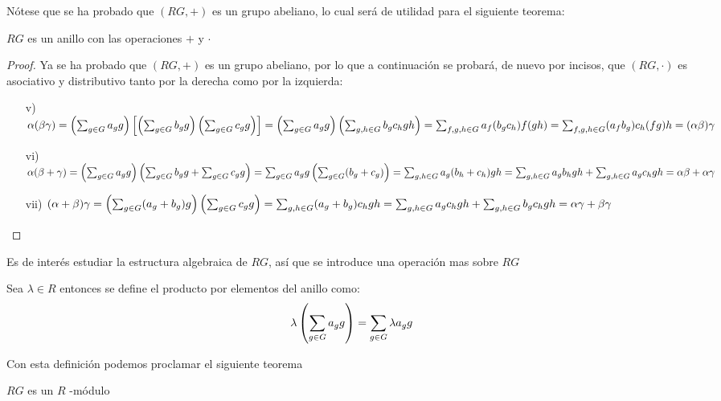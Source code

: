 Nótese que se ha probado que $(RG,+)$ es un grupo abeliano, lo cual será de utilidad para el siguiente teorema:

\begin{teorema}
$RG$ es un anillo con las operaciones $+$ y $\cdot$
\end{teorema}


\begin{proof}
Ya se ha probado que $(RG,+)$ es un grupo abeliano, por lo que a continuación se probará, de nuevo por incisos, que $(RG,\cdot)$ es asociativo y distributivo tanto por la derecha como por la izquierda:
\begin{itemize}
\item[v)] $\alpha(\beta\gamma) = \left(\sum_{g \in G} a_{g} g\right)\left[\left(\sum_{g \in G} b_{g} g\right)\left(\sum_{g \in G} c_{g} g\right)\right] = \left(\sum_{g \in G} a_{g} g\right)\left(\sum_{g,h\in G}b_gc_hgh\right) = \sum_{f,g,h \in G}a_f(b_gc_h)f(gh) = \sum_{f,g,h \in G} (a_fb_g)c_h(fg)h = (\alpha\beta)\gamma$
\item[vi)]  $\alpha(\beta + \gamma) = \left( \sum_{g \in G} a_{g} g \right) \left(\sum_{g \in G} b_{g} g + \sum_{g \in G} c_{g} g \right) = \sum_{g \in G} a_{g} g \left( \sum_{g \in G}(b_g+c_g)\right) = \sum_{g,h \in G}a_g(b_h+c_h)gh  = \sum_{g,h \in G} a_gb_hgh + \sum_{g,h \in G} a_gc_hgh = \alpha\beta + \alpha\gamma$  
\item[vii)] $(\alpha + \beta)\gamma = \left( \sum_{g\in G}(a_g+b_g)g\right) \left(\sum_{g \in G} c_{g} g\right) = \sum_{g,h \in G} (a_g+b_g)c_hgh = \sum_{g,h \in G}a_gc_hgh + \sum_{g,h\in G}b_gc_hgh = \alpha\gamma + \beta\gamma$ \qedhere


\end{itemize}
\end{proof}


Es de interés estudiar la estructura algebraica de $RG$, así que se introduce una operación mas sobre $RG$


\begin{definicion}
Sea $\lambda \in R$ entonces se define el producto por elementos del anillo como: 
\begin{equation}
\lambda \left(\sum_{g \in G} a_{g} g\right) = \sum_{g \in G} \lambda a_{g} g
\end{equation}
\end{definicion}

Con esta definición podemos proclamar el siguiente teorema

\begin{teorema}
$RG$ es un $R$ -módulo
\end{teorema}


